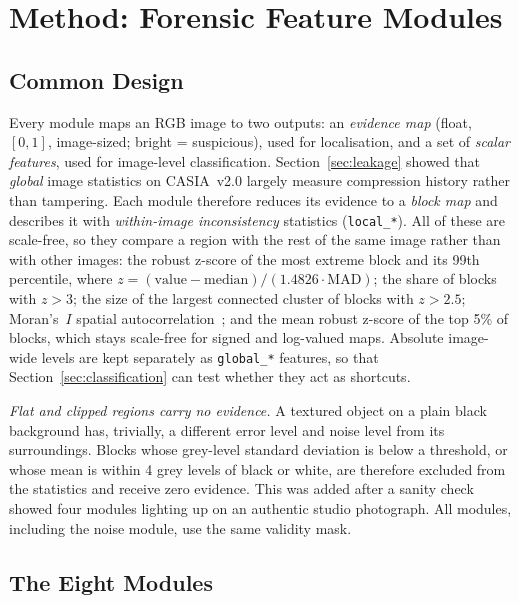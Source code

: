 \section{Method: Forensic Feature Modules}\label{sec:method}

\subsection{Common Design}\label{sec:method-design}

Every module maps an RGB image to two outputs: an \emph{evidence map} (float, $[0,1]$, image-sized; bright =
suspicious), used for localisation, and a set of \emph{scalar features}, used for image-level classification.
Section~\ref{sec:leakage} showed that \emph{global} image statistics on CASIA~v2.0 largely measure compression
history rather than tampering. Each module therefore reduces its evidence to a \emph{block map} and describes it
with \emph{within-image inconsistency} statistics (\texttt{local\_*}). All of these are scale-free, so they compare
a region with the rest of the same image rather than with other images: the robust z-score of the most extreme
block and its 99th percentile, where $z = (\text{value} - \text{median}) / (1.4826\cdot\text{MAD})$; the share of
blocks with $z>3$; the size of the largest connected cluster of blocks with $z>2.5$; Moran's~$I$ spatial
autocorrelation~\cite{moran1950}; and the mean robust z-score of the top 5\% of blocks, which stays scale-free for
signed and log-valued maps. Absolute image-wide levels are kept separately as \texttt{global\_*} features, so that
Section~\ref{sec:classification} can test whether they act as shortcuts.

\emph{Flat and clipped regions carry no evidence.} A textured object on a plain black background has, trivially, a
different error level and noise level from its surroundings. Blocks whose grey-level standard deviation is below a
threshold, or whose mean is within 4 grey levels of black or white, are therefore excluded from the statistics and
receive zero evidence. This was added after a sanity check showed four modules lighting up on an authentic studio
photograph. All modules, including the noise module, use the same validity mask.

\subsection{The Eight Modules}\label{sec:method-modules}

